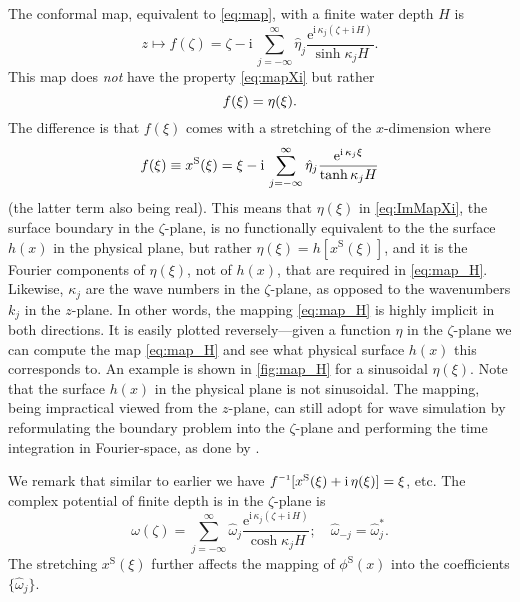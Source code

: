 \documentclass[a4paper,12pt]{article}
\newcommand{\mr}{\mathrm}
\renewcommand{\S}{^\mr{S}}
\newcommand{\ii}{\mr{i}\,}
\newcommand{\ee}{\mr{e}}
\renewcommand{\_}[1]{_\mr{#1}}
\let\Re\relax
\let\Im\relax
\DeclareMathOperator\Re{Re}
\DeclareMathOperator\Im{Im}
\newcommand{\h}{\hat}
\newcommand{\z}{z}
\newcommand{\x}{x}
\newcommand{\zz}{\zeta}
\newcommand{\xx}{\xi}
\newcommand{\kk}{\kappa}
\newcommand{\zmap}{f}
\newcommand{\zzmap}{\zmap^{\raisebox{.2ex}{$\scriptscriptstyle-1$}}}
\newcommand{\ww}{\omega}
\newcommand{\surf}{\eta}
\begin{document}
The conformal map, equivalent to \eqref{eq:map}, with a finite water depth $H$ is
\begin{equation}
z\mapsto \zmap(\zz) = \zz - \ii \sum_{j=-\infty}^\infty \h\eta_j \frac{\ee^{\ii \kk_j(\zz+\ii H)}}{\sinh \kk_jH}.
\label{eq:map_H}
\end{equation}
This map does \textit{not} have the property \eqref{eq:mapXi} but rather
\begin{equation}
\Im \zmap(\xx) = \surf(\xx).
\label{eq:ImMapXi}
\end{equation}
The difference is that $\zmap(\xx)$ comes with a stretching of the $x$-dimension where
\begin{equation}
\Re \zmap(\xx) \equiv x\S(\xx) = \xx -\ii  \sum_{j=-\infty}^\infty \h\eta_j \frac{\ee^{\ii \kk_j\xx}}{\tanh \kk_j H}
\label{eq:mapXi2}
\end{equation}
(the latter term also being real).
This means that $\surf(\xx)$ in \eqref{eq:ImMapXi}, the surface boundary in the $\zz$-plane, is no functionally equivalent to the the surface $h(\x)$ in the physical plane, but rather
$\eta(\xx)=h[x\S(\xx)]$, and it is the Fourier components of $\eta(\xx)$, not of $h(\x)$, that are required in \eqref{eq:map_H}. 
Likewise, $\kk_j$ are the wave numbers in the $\zz$-plane, as opposed to the wavenumbers $k_j$ in the $\z$-plane.
In other words, the mapping \eqref{eq:map_H} is highly implicit in both directions.
It is easily plotted reversely---given a function $\eta$ in the $\zz$-plane we can compute the map \eqref{eq:map_H} and see what physical surface $h(x)$ this corresponds to.
An example is shown in \autoref{fig:map_H} for a sinusoidal $\eta(\xx)$. Note that the surface $h(x)$ in the physical plane is not sinusoidal.
The mapping, being impractical viewed from the $\z$-plane, can still adopt for wave simulation by reformulating the boundary problem into the $\zz$-plane and performing the time integration in Fourier-space, as done by \citet{chalikov2005modeling}.


We remark that similar to earlier we have $\zzmap[x\S(\xx)+\ii\eta(\xx)]=\xx$, etc.
The complex potential of finite depth is in the $\zz$-plane is
\begin{equation}
\ww(\zz) = \sum_{j=-\infty}^\infty\h\ww_j \frac{\ee^{\ii \kk_j(\zz+\ii H)}}{\cosh \kk_j H}; \quad \h\ww_{-j}=\h\ww_{j}^*.
\label{eq:wH}
\end{equation}
The stretching $x\S(\xx)$ further affects the mapping of $\phi\S(\x)$ into the coefficients $\{\h\ww_j\}$.
\end{document}

